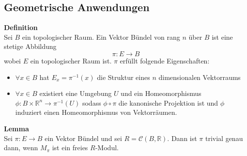 \documentclass[a4paper, 12pt]{article}
\begin{document}
\subsection{Geometrische Anwendungen}
\textbf{Definition}\\
Sei $B$ ein topologischer Raum. Ein Vektor Bündel von rang $n$ über $B$ ist eine stetige Abbildung \[\pi: E \to B\] wobei $E$ ein topologischer Raum ist. $\pi$ erfüllt folgende Eigenschaften: \begin{itemize}
	\item $\forall x \in B$ hat $E_x = \pi^{-1}(x)$ die Struktur eines $n$ dimensionalen Vektorraums
	\item $\forall x \in B$ existiert eine Umgebung $U$ und ein Homeomorphismus $\phi: B \times \mathbb{R}^n \to \pi^{-1}(U)$ sodass $\phi \circ \pi$ die kanonische Projektion ist und $\phi$ induziert einen Homeomorphismus von Vektorräumen.
\end{itemize}
\textbf{Lemma}\\
Sei $\pi: E \to B$ ein Vektor Bündel und sei $R = \mathcal{C}(B,\mathbb{R})$. Dann ist $\pi$ trivial genau dann, wenn $M_\pi$ ist ein freies $R$-Modul. 
\end{document}
